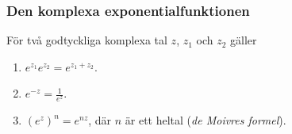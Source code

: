 \documentclass[slidestop,blue,handout,9pt]{beamer}
\begin{document}
\begin{frame}
\frametitle{Den komplexa exponentialfunktionen}

\begin{sats}[Potenslagar]
För två godtyckliga komplexa tal $z$, $z_1$ och $z_2$ gäller

\begin{enumerate}
\item  $e^{z_1}e^{z_2} = e^{z_1 + z_2}$.
\item  $\displaystyle e^{-z} = \frac{1}{e^z}$.
\item  $(e^z)^n = e^{nz}$, där $n$ är ett heltal 
(\emph{de Moivres formel}).
\end{enumerate}
\end{sats}




\end{frame}
\end{document}
